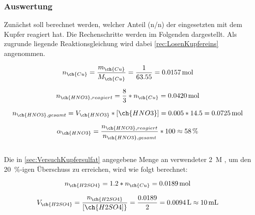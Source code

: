 \documentclass{article}
\begin{document}
     
      \subsubsection{Auswertung} \label{sec:AuswertungKupfersulfat}
      
        Zunächst soll berechnet werden, welcher Anteil (n/n) der eingesetzten  mit dem Kupfer reagiert hat. Die Rechenschritte werden im Folgenden dargestellt. Als zugrunde liegende Reaktionsgleichung wird dabei \ref{rec:LosenKupfereins} angenommen.
        
        \begin{equation}
          n_{\ch{Cu}} = \frac{m_{\ch{Cu}}}{M_{\ch{Cu}}} = \frac{1}{63.55} = \SI[mode=text]{0.0157}{\mole}
        \end{equation}
        
        \begin{equation}
          n_{\ch{HNO3}, reagiert} = \frac{8}{3} * n_{\ch{Cu}} = \SI[mode=text]{0.0420}{\mole}
        \end{equation}
        
        \begin{equation}
          n_{\ch{HNO3}, gesamt} = V_{\ch{HNO3}} * [\ch{HNO3}] = 0.005 * 14.5 = \SI[mode=text]{0.0725}{\mole}
        \end{equation}
        
        \begin{equation}
          \alpha_{\ch{HNO3}} = \frac{n_{\ch{HNO3}, reagiert}}{n_{\ch{HNO3}, gesamt}} * 100 \approx \SI[mode=text]{58}{\percent} 
        \end{equation} \\
        
        Die in \ref{sec:VersuchKupfersulfat} angegebene Menge an verwendeter \SI[mode=text]{2}{M} , um den \SI[mode=text]{20}{\percent}-igen Überschuss zu erreichen, wird wie folgt berechnet:
        
        \begin{equation}
          n_{\ch{H2SO4}} = 1.2 * n_{\ch{Cu}} = \SI[mode=text]{0.0189}{\mole} 
        \end{equation}
        
        \begin{equation}
          V_{\ch{H2SO4}} = \frac{n_{\ch{H2SO4}}}{[\ch{H2SO4]}} = \frac{0.0189}{2} = \SI[mode=text]{0.0094}{\liter} \approx \SI[mode=text]{10}{\milli\liter}
        \end{equation} \\
      
\end{document}
